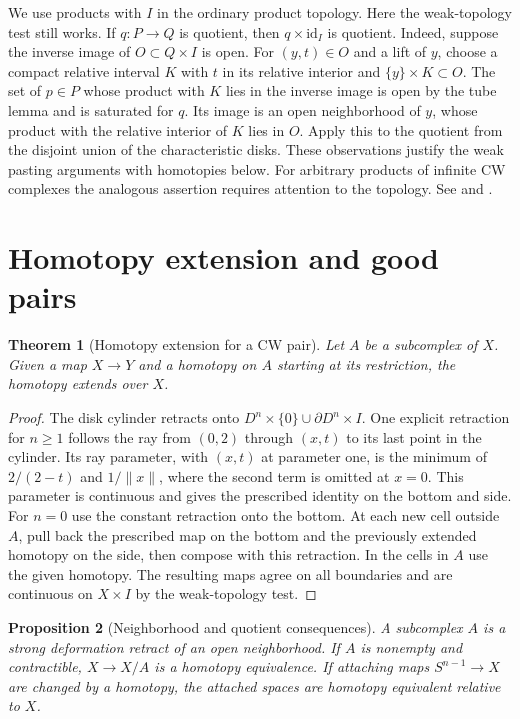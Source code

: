 \documentclass[11pt,oneside,openany]{book}
\theoremstyle{plain}
\newtheorem{theorem}{Theorem}[chapter]
\newtheorem{proposition}[theorem]{Proposition}
\theoremstyle{definition}
\theoremstyle{remark}
\begin{document}
We use products with \(I\) in the ordinary product topology.
Here the weak-topology test still works. If \(q:P\to Q\)
is quotient, then \(q\times\mathrm{id}_I\) is quotient.
Indeed, suppose the inverse image of \(O\subset Q\times I\)
is open. For \((y,t)\in O\) and a lift of \(y\), choose
a compact relative interval \(K\) with \(t\) in its relative
interior and \(\{y\}\times K\subset O\). The set of
\(p\in P\) whose product with \(K\) lies in the inverse
image is open by the tube lemma and is saturated for \(q\).
Its image is an open neighborhood of \(y\), whose product
with the relative interior of \(K\) lies in \(O\).
Apply this to the quotient from the disjoint union of the
characteristic disks. These observations justify the weak
pasting arguments with homotopies below. For arbitrary
products of infinite CW complexes the analogous assertion
requires attention to the topology. See \cite[Chapter 0 and
Appendix]{Hatcher} and \cite[Sections 1.2--1.5]{MKP}.

\section{Homotopy extension and good pairs}\label{p202:T10}

\begin{theorem}[Homotopy extension for a CW pair]
\label{thm:p202-cw-hep}
Let \(A\) be a subcomplex of \(X\). Given a map \(X\to Y\)
and a homotopy on \(A\) starting at its restriction, the
homotopy extends over \(X\).
\end{theorem}

\begin{proof}
The disk cylinder retracts onto
\(D^n\times\{0\}\cup\partial D^n\times I\).
One explicit retraction for \(n\ge1\) follows the ray
from \((0,2)\) through \((x,t)\) to its last point in the
cylinder. Its ray parameter, with \((x,t)\) at parameter
one, is the minimum of \(2/(2-t)\) and \(1/\lVert x\rVert\),
where the second term is omitted at \(x=0\).
This parameter is continuous and gives the prescribed
identity on the bottom and side. For \(n=0\) use the
constant retraction onto the bottom. At each new cell
outside \(A\), pull back the prescribed map on the bottom
and the previously extended homotopy on the side, then
compose with this retraction. In the cells in \(A\) use
the given homotopy. The resulting maps agree on all
boundaries and are continuous on \(X\times I\) by the
weak-topology test.
\end{proof}

\begin{proposition}[Neighborhood and quotient consequences]
\label{prop:p202-cw-neighborhood}
A subcomplex \(A\) is a strong deformation retract of an
open neighborhood. If \(A\) is nonempty and contractible,
\(X\to X/A\) is a homotopy equivalence. If attaching maps
\(S^{n-1}\to X\) are changed by a homotopy, the attached
spaces are homotopy equivalent relative to \(X\).
\end{proposition}
\end{document}
